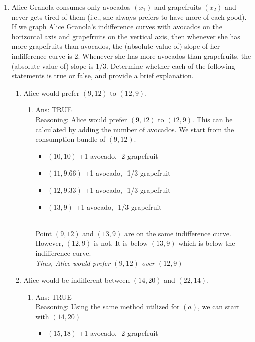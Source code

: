 \documentclass[11pt]{article}
\begin{document}
\begin{enumerate}
\item Alice Granola consumes only avocados $(x_{1})$ and grapefruits $(x_{2})$ and never gets tired of them (i.e., she always prefers to have more of each good). If we graph Alice Granola’s indifference curves with avocados on the horizontal axis and grapefruits on the vertical axis, then whenever she has more grapefruits than avocados, the (absolute value of) slope of her indifference curve is 2. Whenever she has more avocados than grapefruits, the (absolute value of) slope is 1/3. Determine whether each of the following statements is true or false, and provide a brief explanation.
    \begin{enumerate}
        \item Alice would prefer $(9,12)$ to $(12,9)$.
        \begin{enumerate}
            \item Ans: TRUE
            \\Reasoning: Alice would prefer $(9,12)$ to $(12,9)$. This can be calculated by adding the number of avocados. We start from the consumption bundle of $(9,12)$.
            \begin{itemize}
                \item $(10,10)$ +1 avocado, -2 grapefruit
                \item $(11, 9.66)$ +1 avocado, -1/3 grapefruit
                \item $(12, 9.33)$ +1 avocado, -1/3 grapefruit
                \item $(13,9)$ +1 avocado, -1/3 grapefruit
            \end{itemize}
            \\Point $(9,12)$ and $(13,9)$ are on the same indifference curve. However, $(12,9)$ is not. It is below $(13,9)$ which is below the indifference curve. 
            \\
            \textit{Thus, Alice would prefer $(9,12)$ over $(12,9)$}
        \end{enumerate}
        \item Alice would be indifferent between $(14,20)$ and $(22,14)$.
        \begin{enumerate}
            \item Ans: TRUE
            \\Reasoning: Using the same method utilized for $(a)$, we can start with $(14,20)$
            \begin{itemize}
                \item $(15,18)$ +1 avocado, -2 grapefruit

\end{itemize}
\end{enumerate}
\end{enumerate}
\end{enumerate}
\end{document}
